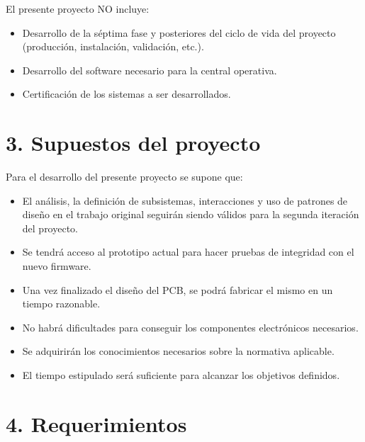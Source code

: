 \documentclass[11pt]{charter}
\begin{document}
El presente proyecto NO incluye:

\begin{itemize}
\item Desarrollo de la séptima fase y posteriores del ciclo de vida del proyecto (producción, instalación, validación, etc.).
\item Desarrollo del software necesario para la central operativa.
\item Certificación de los sistemas a ser desarrollados.
\end{itemize}

\section{3. Supuestos del proyecto}
\label{sec:supuestos}

Para el desarrollo del presente proyecto se supone que:

\begin{itemize}
\item El análisis, la definición de subsistemas, interacciones y uso de patrones de diseño en el trabajo original seguirán 
siendo válidos para la segunda iteración del proyecto.
\item Se tendrá acceso al prototipo actual para hacer pruebas de integridad con el nuevo firmware.
\item Una vez finalizado el diseño del PCB, se podrá fabricar el mismo en un tiempo razonable. 
\item No habrá dificultades para conseguir los componentes electrónicos necesarios.
\item Se adquirirán los conocimientos necesarios sobre la normativa aplicable.
\item El tiempo estipulado será suficiente para alcanzar los objetivos definidos.
\end{itemize}

\section{4. Requerimientos}
\label{sec:requerimientos}
\end{document}

